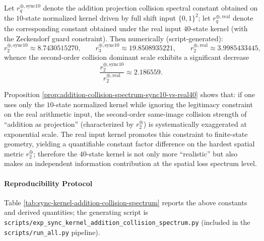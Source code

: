 \begin{proposition}\label{prop:addition-collision-spectrum-sync10-vs-real40}
Let \(r_q^{\oplus,\mathrm{sync10}}\) denote the addition projection collision spectral constant obtained on the $10$-state normalized kernel driven by full shift input \(\{0,1\}^2\);
let \(r_q^{\oplus,\mathrm{real}}\) denote the corresponding constant obtained under the real input \(40\)-state kernel (with the Zeckendorf guard constraint).
Then numerically (script-generated):
\[
r_2^{\oplus,\mathrm{sync10}}\approx 8.7430515270,\qquad
r_3^{\oplus,\mathrm{sync10}}\approx 19.8508935221,\qquad
r_2^{\oplus,\mathrm{real}}\approx 3.9985433445,
\]
whence the second-order collision dominant scale exhibits a significant decrease
\[
\frac{r_2^{\oplus,\mathrm{sync10}}}{r_2^{\oplus,\mathrm{real}}}\approx 2.186559.
\]
\end{proposition}

\begin{remark}
\label{rem:addition-collision-spectrum-interpretation}
Proposition \ref{prop:addition-collision-spectrum-sync10-vs-real40} shows that:
if one uses only the $10$-state normalized kernel while ignoring the legitimacy constraint on the real arithmetic input, the second-order same-image collision strength of ``addition as projection'' (characterized by \(r_2^{\oplus}\)) is systematically exaggerated at exponential scale.
The real input kernel promotes this constraint to finite-state geometry, yielding a quantifiable constant factor difference on the hardest spatial metric \(r_2^{\oplus}\);
therefore the \(40\)-state kernel is not only more ``realistic'' but also makes an independent information contribution at the spatial loss spectrum level.
\end{remark}

\paragraph{Reproducibility Protocol}
Table \ref{tab:sync-kernel-addition-collision-spectrum} reports the above constants and derived quantities; the generating script is
\texttt{scripts/exp\_sync\_kernel\_addition\_collision\_spectrum.py} (included in the \texttt{scripts/run\_all.py} pipeline).

